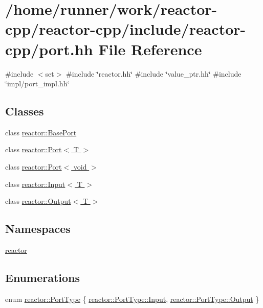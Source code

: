 \hypertarget{port_8hh}{}\section{/home/runner/work/reactor-\/cpp/reactor-\/cpp/include/reactor-\/cpp/port.hh File Reference}
\label{port_8hh}
{\ttfamily \#include $<$set$>$}\newline
{\ttfamily \#include \char`\"{}reactor.\+hh\char`\"{}}\newline
{\ttfamily \#include \char`\"{}value\+\_\+ptr.\+hh\char`\"{}}\newline
{\ttfamily \#include \char`\"{}impl/port\+\_\+impl.\+hh\char`\"{}}\newline
\subsection*{Classes}
\begin{DoxyCompactItemize}
\item 
class \hyperlink{classreactor_1_1BasePort}{reactor\+::\+Base\+Port}
\item 
class \hyperlink{classreactor_1_1Port}{reactor\+::\+Port$<$ T $>$}
\item 
class \hyperlink{classreactor_1_1Port_3_01void_01_4}{reactor\+::\+Port$<$ void $>$}
\item 
class \hyperlink{classreactor_1_1Input}{reactor\+::\+Input$<$ T $>$}
\item 
class \hyperlink{classreactor_1_1Output}{reactor\+::\+Output$<$ T $>$}
\end{DoxyCompactItemize}
\subsection*{Namespaces}
\begin{DoxyCompactItemize}
\item 
 \hyperlink{namespacereactor}{reactor}
\end{DoxyCompactItemize}
\subsection*{Enumerations}
\begin{DoxyCompactItemize}
\item 
enum \hyperlink{namespacereactor_a08c8e2d85e5bc706b1af8a87e40eec6d}{reactor\+::\+Port\+Type} \{ \hyperlink{namespacereactor_a08c8e2d85e5bc706b1af8a87e40eec6da324118a6721dd6b8a9b9f4e327df2bf5}{reactor\+::\+Port\+Type\+::\+Input}, 
\hyperlink{namespacereactor_a08c8e2d85e5bc706b1af8a87e40eec6da29c2c02a361c9d7028472e5d92cd4a54}{reactor\+::\+Port\+Type\+::\+Output}
 \}
\end{DoxyCompactItemize}
